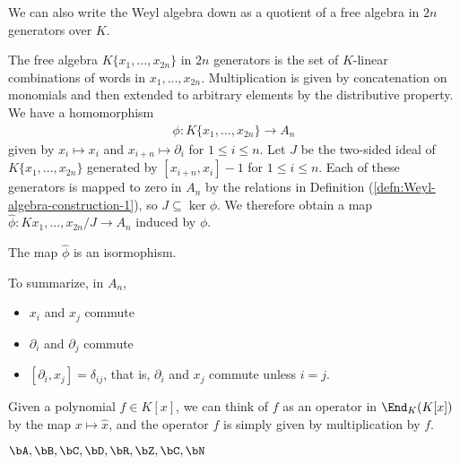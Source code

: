 We can also write the Weyl algebra down as a quotient of a free algebra in $2n$ generators over $K$. 

\begin{defn}\label{defn:Weyl-algebra-construction-2}
	The free algebra $K\{x_1,...,x_{2n}\}$ in $2n$ generators is the set of $K$-linear combinations of words in $x_1,...,x_{2n}$. Multiplication is given by concatenation on monomials and then extended to arbitrary elements by the distributive property. We have a homomorphism
	\begin{align*}
		\phi:K\{x_1,...,x_{2n}\} \to A_n
	\end{align*}
	given by $x_i \mapsto x_i$ and $x_{i+n} \mapsto \partial_i$ for $1\leq i\leq n$. Let $J$ be the two-sided ideal of  $K\{x_1,...,x_{2n}\}$ generated by $[x_{i+n},x_i] - 1$ for $1\leq i\leq n$. Each of these generators is mapped to zero in $A_n$ by the relations in Definition (\ref{defn:Weyl-algebra-construction-1}), so $J \subseteq \ker \phi$. We therefore obtain a map $\hat{\phi}:K{x_1,...,x_{2n}}/J\to A_n$ induced by $\phi$.
\end{defn}

\begin{thm}\label{thm:Weyl-constructions-iso}
	The map $\hat{\phi}$ is an isormophism.
\end{thm}

To summarize, in $A_n$,
\begin{itemize}
	\item $x_i$ and $x_j$ commute
	\item $\partial_i$ and $\partial_j$ commute
	\item $[\partial_i,x_j] = \delta_{ij}$, that is, $\partial_i$ and $x_j$ commute unless $i = j$.
\end{itemize}
\begin{example}\label{example:commutator-as-derivative-one-dim}
    Given a polynomial $f \in K[x]$, we can think of $f$ as an operator in $\End_K(K[x])$ by the map $x \mapsto \hat{x}$, and the operator $f$ is simply given by multiplication by $f$.
\end{example}

$ \bA, \bB, \bC, \bD, \bR, \bZ, \bC, \bN$

